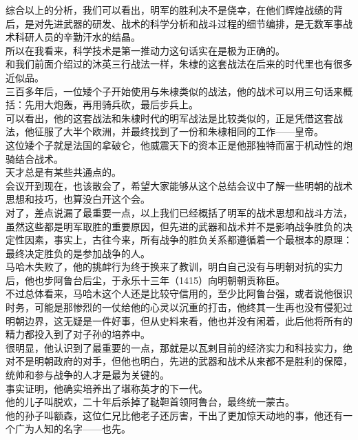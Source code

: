 \begin{multicols}{\theparacolNo}
综合以上的分析，我们可以看出，明军的胜利决不是侥幸，在他们辉煌战绩的背后，是对先进武器的研发、战术的科学分析和战斗过程的细节编排，是无数军事战术科研人员的辛勤汗水的结晶。\\

所以在我看来，科学技术是第一推动力这句话实在是极为正确的。\\

和我们前面介绍过的沐英三行战法一样，朱棣的这套战法在后来的时代里也有很多近似品。\\

三百多年后，一位矮个子开始使用与朱棣类似的战法，他的战术可以用三句话来概括：先用大炮轰，再用骑兵砍，最后步兵上。\\

可以看出，他的这套战法和朱棣时代的明军战法是比较类似的，正是凭借这套战法，他征服了大半个欧洲，并最终找到了一份和朱棣相同的工作——皇帝。\\

这位矮个子就是法国的拿破仑，他威震天下的资本正是他那独特而富于机动性的炮骑结合战术。\\

天才总是有某些共通点的。\\

会议开到现在，也该散会了，希望大家能够从这个总结会议中了解一些明朝的战术思想和技巧，也算没白开这个会。\\

对了，差点说漏了最重要一点，以上我们已经概括了明军的战术思想和战斗方法，虽然这些都是明军取胜的重要原因，但先进的武器和战术并不是影响战争胜负的决定性因素，事实上，古往今来，所有战争的胜负关系都遵循着一个最根本的原理：\\

最终决定胜负的是参加战争的人。\\

马哈木失败了，他的挑衅行为终于换来了教训，明白自己没有与明朝对抗的实力后，他也步阿鲁台后尘，于永乐十三年（1415）向明朝朝贡称臣。\\

不过总体看来，马哈木这个人还是比较守信用的，至少比阿鲁台强，或者说他很识时务，可能是那惨烈的一仗给他的心灵以沉重的打击，他终其一生再也没有侵犯过明朝边界，这无疑是一件好事，但从史料来看，他也并没有闲着，此后他将所有的精力都投入到了对子孙的培养中。\\

很明显，他认识到了最重要的一点，那就是以瓦剌目前的经济实力和科技实力，绝对不是明朝政府的对手，但他也明白，先进的武器和战术从来都不是胜利的保障，统帅和参与战争的人才是最为关键的。\\

事实证明，他确实培养出了堪称英才的下一代。\\

他的儿子叫脱欢，二十年后杀掉了鞑靼首领阿鲁台，最终统一蒙古。\\

他的孙子叫额森，这位仁兄比他老子还厉害，干出了更加惊天动地的事，他还有一个广为人知的名字——也先。\\
\ifnum{}
	\end{multicols}
\fi
\newpage
